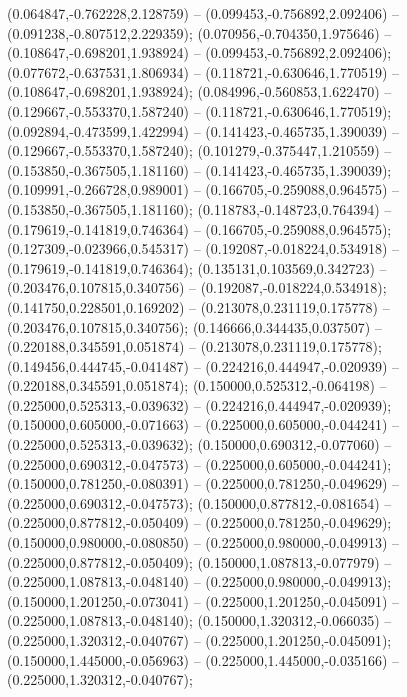  (0.064847,-0.762228,2.128759) -- (0.099453,-0.756892,2.092406) -- (0.091238,-0.807512,2.229359);
 (0.070956,-0.704350,1.975646) -- (0.108647,-0.698201,1.938924) -- (0.099453,-0.756892,2.092406);
 (0.077672,-0.637531,1.806934) -- (0.118721,-0.630646,1.770519) -- (0.108647,-0.698201,1.938924);
 (0.084996,-0.560853,1.622470) -- (0.129667,-0.553370,1.587240) -- (0.118721,-0.630646,1.770519);
 (0.092894,-0.473599,1.422994) -- (0.141423,-0.465735,1.390039) -- (0.129667,-0.553370,1.587240);
 (0.101279,-0.375447,1.210559) -- (0.153850,-0.367505,1.181160) -- (0.141423,-0.465735,1.390039);
 (0.109991,-0.266728,0.989001) -- (0.166705,-0.259088,0.964575) -- (0.153850,-0.367505,1.181160);
 (0.118783,-0.148723,0.764394) -- (0.179619,-0.141819,0.746364) -- (0.166705,-0.259088,0.964575);
 (0.127309,-0.023966,0.545317) -- (0.192087,-0.018224,0.534918) -- (0.179619,-0.141819,0.746364);
 (0.135131,0.103569,0.342723) -- (0.203476,0.107815,0.340756) -- (0.192087,-0.018224,0.534918);
 (0.141750,0.228501,0.169202) -- (0.213078,0.231119,0.175778) -- (0.203476,0.107815,0.340756);
 (0.146666,0.344435,0.037507) -- (0.220188,0.345591,0.051874) -- (0.213078,0.231119,0.175778);
 (0.149456,0.444745,-0.041487) -- (0.224216,0.444947,-0.020939) -- (0.220188,0.345591,0.051874);
 (0.150000,0.525312,-0.064198) -- (0.225000,0.525313,-0.039632) -- (0.224216,0.444947,-0.020939);
 (0.150000,0.605000,-0.071663) -- (0.225000,0.605000,-0.044241) -- (0.225000,0.525313,-0.039632);
 (0.150000,0.690312,-0.077060) -- (0.225000,0.690312,-0.047573) -- (0.225000,0.605000,-0.044241);
 (0.150000,0.781250,-0.080391) -- (0.225000,0.781250,-0.049629) -- (0.225000,0.690312,-0.047573);
 (0.150000,0.877812,-0.081654) -- (0.225000,0.877812,-0.050409) -- (0.225000,0.781250,-0.049629);
 (0.150000,0.980000,-0.080850) -- (0.225000,0.980000,-0.049913) -- (0.225000,0.877812,-0.050409);
 (0.150000,1.087813,-0.077979) -- (0.225000,1.087813,-0.048140) -- (0.225000,0.980000,-0.049913);
 (0.150000,1.201250,-0.073041) -- (0.225000,1.201250,-0.045091) -- (0.225000,1.087813,-0.048140);
 (0.150000,1.320312,-0.066035) -- (0.225000,1.320312,-0.040767) -- (0.225000,1.201250,-0.045091);
 (0.150000,1.445000,-0.056963) -- (0.225000,1.445000,-0.035166) -- (0.225000,1.320312,-0.040767);
